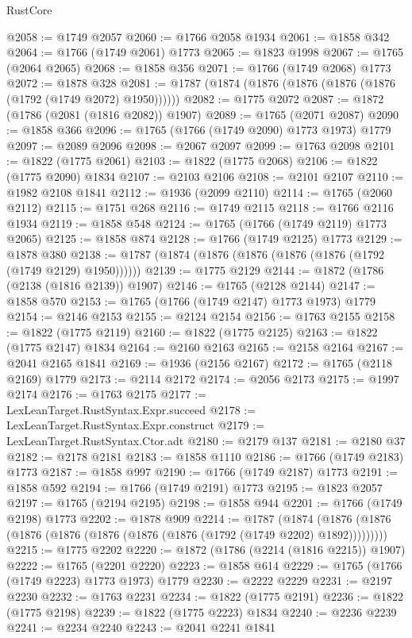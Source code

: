 \begin{lexlean}{RustCore}
\begin{coremodule}
@2058 := @1749 @2057
@2060 := @1766 @2058 @1934
@2061 := @1858 @342
@2064 := @1766 (@1749 @2061) @1773
@2065 := @1823 @1998
@2067 := @1765 (@2064 @2065)
@2068 := @1858 @356
@2071 := @1766 (@1749 @2068) @1773
@2072 := @1878 @328
@2081 := @1787 (@1874 (@1876 (@1876 (@1876 (@1876 (@1792 (@1749 @2072) @1950))))))
@2082 := @1775 @2072
@2087 := @1872 (@1786 (@2081 (@1816 @2082)) @1907)
@2089 := @1765 (@2071 @2087)
@2090 := @1858 @366
@2096 := @1765 (@1766 (@1749 @2090) @1773 @1973) @1779
@2097 := @2089 @2096
@2098 := @2067 @2097
@2099 := @1763 @2098
@2101 := @1822 (@1775 @2061)
@2103 := @1822 (@1775 @2068)
@2106 := @1822 (@1775 @2090) @1834
@2107 := @2103 @2106
@2108 := @2101 @2107
@2110 := @1982 @2108 @1841
@2112 := @1936 (@2099 @2110)
@2114 := @1765 (@2060 @2112)
@2115 := @1751 @268
@2116 := @1749 @2115
@2118 := @1766 @2116 @1934
@2119 := @1858 @548
@2124 := @1765 (@1766 (@1749 @2119) @1773 @2065)
@2125 := @1858 @874
@2128 := @1766 (@1749 @2125) @1773
@2129 := @1878 @380
@2138 := @1787 (@1874 (@1876 (@1876 (@1876 (@1876 (@1792 (@1749 @2129) @1950))))))
@2139 := @1775 @2129
@2144 := @1872 (@1786 (@2138 (@1816 @2139)) @1907)
@2146 := @1765 (@2128 @2144)
@2147 := @1858 @570
@2153 := @1765 (@1766 (@1749 @2147) @1773 @1973) @1779
@2154 := @2146 @2153
@2155 := @2124 @2154
@2156 := @1763 @2155
@2158 := @1822 (@1775 @2119)
@2160 := @1822 (@1775 @2125)
@2163 := @1822 (@1775 @2147) @1834
@2164 := @2160 @2163
@2165 := @2158 @2164
@2167 := @2041 @2165 @1841
@2169 := @1936 (@2156 @2167)
@2172 := @1765 (@2118 @2169) @1779
@2173 := @2114 @2172
@2174 := @2056 @2173
@2175 := @1997 @2174
@2176 := @1763 @2175
@2177 := LexLeanTarget.RustSyntax.Expr.succeed
@2178 := LexLeanTarget.RustSyntax.Expr.construct
@2179 := LexLeanTarget.RustSyntax.Ctor.adt
@2180 := @2179 @137
@2181 := @2180 @37
@2182 := @2178 @2181
@2183 := @1858 @1110
@2186 := @1766 (@1749 @2183) @1773
@2187 := @1858 @997
@2190 := @1766 (@1749 @2187) @1773
@2191 := @1858 @592
@2194 := @1766 (@1749 @2191) @1773
@2195 := @1823 @2057
@2197 := @1765 (@2194 @2195)
@2198 := @1858 @944
@2201 := @1766 (@1749 @2198) @1773
@2202 := @1878 @909
@2214 := @1787
    (@1874 (@1876 (@1876 (@1876 (@1876 (@1876 (@1876 (@1876 (@1792 (@1749 @2202) @1892)))))))))
@2215 := @1775 @2202
@2220 := @1872 (@1786 (@2214 (@1816 @2215)) @1907)
@2222 := @1765 (@2201 @2220)
@2223 := @1858 @614
@2229 := @1765 (@1766 (@1749 @2223) @1773 @1973) @1779
@2230 := @2222 @2229
@2231 := @2197 @2230
@2232 := @1763 @2231
@2234 := @1822 (@1775 @2191)
@2236 := @1822 (@1775 @2198)
@2239 := @1822 (@1775 @2223) @1834
@2240 := @2236 @2239
@2241 := @2234 @2240
@2243 := @2041 @2241 @1841

\end{coremodule}
\end{lexlean}
